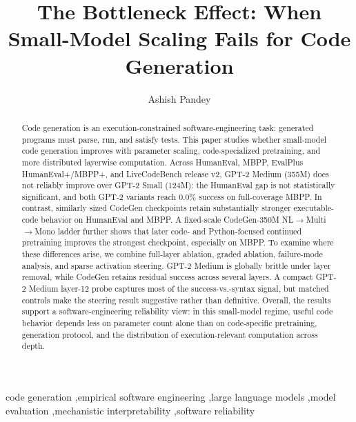 \documentclass[preprint,12pt,authoryear]{elsarticle}
\begin{document}
\begin{frontmatter}

\title{The Bottleneck Effect: When Small-Model Scaling Fails for Code Generation}

\author[inst1]{Ashish Pandey}


\begin{abstract}
Code generation is an execution-constrained software-engineering task: generated programs must parse, run, and satisfy tests. This paper studies whether small-model code generation improves with parameter scaling, code-specialized pretraining, and more distributed layerwise computation. Across HumanEval, MBPP, EvalPlus HumanEval+/MBPP+, and LiveCodeBench release v2, GPT-2 Medium (355M) does not reliably improve over GPT-2 Small (124M): the HumanEval gap is not statistically significant, and both GPT-2 variants reach 0.0\% success on full-coverage MBPP. In contrast, similarly sized CodeGen checkpoints retain substantially stronger executable-code behavior on HumanEval and MBPP. A fixed-scale CodeGen-350M NL$\rightarrow$Multi$\rightarrow$Mono ladder further shows that later code- and Python-focused continued pretraining improves the strongest checkpoint, especially on MBPP. To examine where these differences arise, we combine full-layer ablation, graded ablation, failure-mode analysis, and sparse activation steering. GPT-2 Medium is globally brittle under layer removal, while CodeGen retains residual success across several layers. A compact GPT-2 Medium layer-12 probe captures most of the success-vs.-syntax signal, but matched controls make the steering result suggestive rather than definitive. Overall, the results support a software-engineering reliability view: in this small-model regime, useful code behavior depends less on parameter count alone than on code-specific pretraining, generation protocol, and the distribution of execution-relevant computation across depth.
\end{abstract}

\begin{keyword}
code generation \sep empirical software engineering \sep large language models \sep model evaluation \sep mechanistic interpretability \sep software reliability
\end{keyword}

\end{frontmatter}
\end{document}
